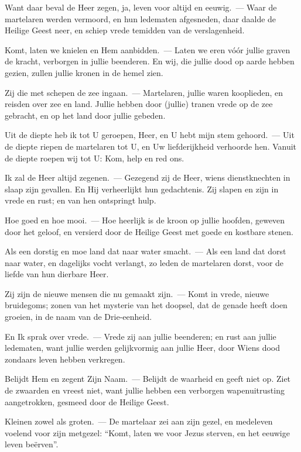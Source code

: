 \documentclass[12pt,twoside,a5paper]{article}
\begin{document}
\begin{halfparskip}
  Want daar beval de Heer zegen, ja, leven voor altijd en eeuwig.~--- Waar de martelaren werden vermoord, en hun ledematen afgesneden, daar daalde de Heilige Geest neer, en schiep vrede temidden van de verslagenheid.

  Komt, laten we knielen en Hem aanbidden.~--- Laten we eren vóór jullie graven de kracht, verborgen in jullie beenderen. En wij, die jullie dood op aarde hebben gezien, zullen jullie kronen in de hemel zien.

  Zij die met schepen de zee ingaan.~--- Martelaren, jullie waren kooplieden, en reisden over zee en land. Jullie hebben door (jullie) tranen vrede op de zee gebracht, en op het land door jullie gebeden.

  Uit de diepte heb ik tot U geroepen, Heer, en U hebt mijn stem gehoord.~--- Uit de diepte riepen de martelaren tot U, en Uw liefderijkheid verhoorde hen. Vanuit de diepte roepen wij tot U: Kom, help en red ons.

  Ik zal de Heer altijd zegenen.~--- Gezegend zij de Heer, wiens dienstknechten in slaap zijn gevallen. En Hij verheerlijkt hun gedachtenis. Zij slapen en zijn in vrede en rust; en van hen ontspringt hulp.

  Hoe goed en hoe mooi.~--- Hoe heerlijk is de kroon op jullie hoofden, geweven door het geloof, en versierd door de Heilige Geest met goede en kostbare stenen.

  Als een dorstig en moe land dat naar water smacht.~--- Als een land dat dorst naar water, en dagelijks vocht verlangt, zo leden de martelaren dorst, voor de liefde van hun dierbare Heer.

  Zij zijn de nieuwe mensen die nu gemaakt zijn.~--- Komt in vrede, nieuwe bruidegoms; zonen van het mysterie van het doopsel, dat de genade heeft doen groeien, in de naam van de Drie-eenheid.

  En Ik sprak over vrede.~--- Vrede zij aan jullie beenderen; en rust aan jullie ledematen, want jullie werden gelijkvormig aan jullie Heer, door Wiens dood zondaars leven hebben verkregen.

  Belijdt Hem en zegent Zijn Naam.~--- Belijdt de waarheid en geeft niet op. Ziet de zwaarden en vreest niet, want jullie hebben een verborgen wapenuitrusting aangetrokken, gesmeed door de Heilige Geest.

  Kleinen zowel als groten.~--- De martelaar zei aan zijn gezel, en medeleven voelend voor zijn metgezel: ``Komt, laten we voor Jezus sterven, en het eeuwige leven beërven''.


\end{halfparskip}
\end{document}
